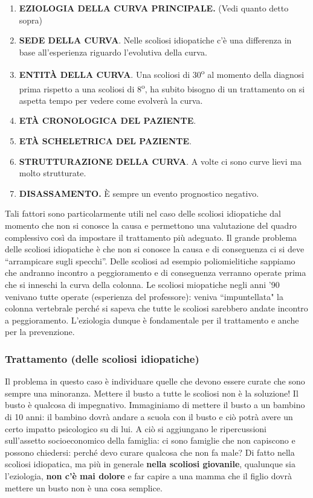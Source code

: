 \begin{enumerate}
\def\labelenumi{\arabic{enumi}.}
\item
  \textbf{EZIOLOGIA DELLA CURVA PRINCIPALE.} (Vedi quanto detto sopra)
\item
  \textbf{SEDE DELLA CURVA}. Nelle scoliosi idiopatiche c'è una
  differenza in base all'esperienza riguardo l'evolutiva della curva.
\item 
  \textbf{ENTITÀ DELLA CURVA}. Una scoliosi di 30\textsuperscript{o} al momento della
  diagnosi prima rispetto a una scoliosi di 8\textsuperscript{o}, ha subito bisogno di un
  trattamento on si aspetta tempo per vedere come evolverà la curva.
\item 
  \textbf{ETÀ CRONOLOGICA DEL PAZIENTE}.
\item 
  \textbf{ETÀ SCHELETRICA DEL PAZIENTE}.
\item 
  \textbf{STRUTTURAZIONE DELLA CURVA}. A volte ci sono curve lievi ma
  molto strutturate.
\item 
  \textbf{DISASSAMENTO.} È sempre un evento prognostico negativo.
\end{enumerate}

Tali fattori sono particolarmente utili nel caso delle scoliosi
idiopatiche dal momento che non si conosce la causa e permettono una
valutazione del quadro complessivo così da impostare il trattamento più
adeguato. Il grande problema delle scoliosi idiopatiche è che non si
conosce la causa e di conseguenza ci si deve ``arrampicare sugli
specchi''. Delle scoliosi ad esempio poliomielitiche sappiamo che
andranno incontro a peggioramento e di conseguenza verranno operate
prima che si inneschi la curva della colonna. Le scoliosi miopatiche
negli anni '90 venivano tutte operate (esperienza del professore):
veniva ``impuntellata" la colonna vertebrale perché si sapeva che tutte
le scoliosi sarebbero andate incontro a peggioramento. L'eziologia
dunque è fondamentale per il trattamento e anche per la prevenzione.

\subsubsection{Trattamento (delle scoliosi idiopatiche)}


Il problema in questo caso è individuare quelle che devono essere curate
che sono sempre una minoranza. Mettere il busto a tutte le scoliosi non
è la soluzione! Il busto è qualcosa di impegnativo. Immaginiamo di
mettere il busto a un bambino di 10 anni: il bambino dovrà andare a
scuola con il busto e ciò potrà avere un certo impatto psicologico su di
lui. A ciò si aggiungano le ripercussioni sull'assetto socioeconomico
della famiglia: ci sono famiglie che non capiscono e possono chiedersi:
perché devo curare qualcosa che non fa male? Di fatto nella scoliosi
idiopatica, ma più in generale \textbf{nella scoliosi giovanile},
qualunque sia l'eziologia, \textbf{non c'è mai dolore} e far capire a
una mamma che il figlio dovrà mettere un busto non è una cosa semplice.

